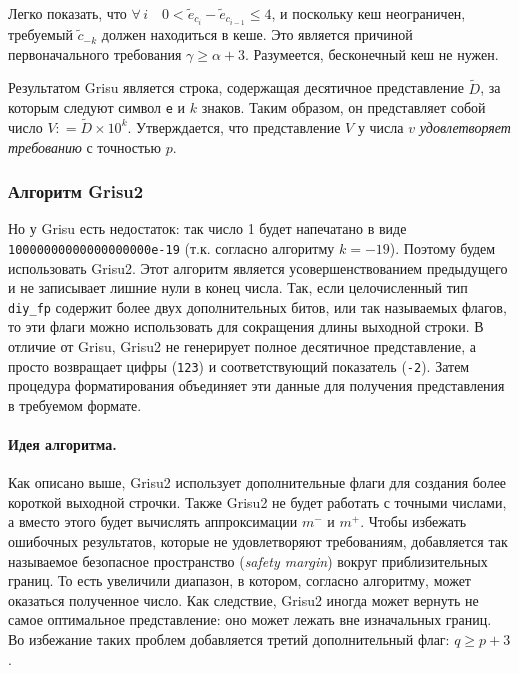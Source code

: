 Легко показать, что $\forall \, i \quad 0 < \tilde{e}_{c_i} - \tilde{e}_{c_{i-1}} \leqslant 4$, и поскольку кеш неограничен, требуемый $\tilde{c}_{-k}$ должен находиться в кеше. 
Это является причиной первоначального требования $\gamma \geqslant \alpha + 3$.
Разумеется, бесконечный кеш не нужен. 

Результатом \textsf{Grisu} является строка, содержащая десятичное представление $\tilde{D}$, за которым следуют символ \texttt{e} и $k$ знаков. 
Таким образом, он представляет собой число $V: = \tilde{D} \times 10^k$. 
Утверждается, что представление $V$ у числа $v$ \textit{удовлетворяет требованию} с точностью $p$.

\subsubsection{Алгоритм \textsf{Grisu2}}
Но у \textsf{Grisu} есть недостаток: так число 1 будет напечатано в виде \\ \texttt{10000000000000000000e-19} (т.к. согласно алгоритму $k=-19$).
Поэтому будем использовать \textsf{Grisu2}.
Этот алгоритм является усовершенствованием предыдущего и не записывает лишние нули в конец числа.
Так, если целочисленный тип \texttt{diy\_fp} содержит более двух дополнительных битов, или так называемых флагов, то эти флаги можно использовать для сокращения длины выходной строки.
В отличие от \textsf{Grisu}, \textsf{Grisu2} не генерирует полное десятичное представление, а просто возвращает цифры (\texttt{123}) и соответствующий показатель (\texttt{-2}). 
Затем процедура форматирования объединяет эти данные для получения представления в требуемом формате.

\paragraph{Идея алгоритма.} 
Как описано выше, \textsf{Grisu2} использует дополнительные флаги для создания более короткой выходной строчки. 
Также \textsf{Grisu2} не будет работать с точными числами, а вместо этого будет вычислять аппроксимации $m^{-}$ и $m^+$. 
Чтобы избежать ошибочных результатов, которые не удовлетворяют требованиям, добавляется так называемое безопасное пространство (\textit{safety margin}) вокруг приблизительных границ.
То есть увеличили диапазон, в котором, согласно алгоритму, может оказаться полученное число.  
Как следствие, \textsf{Grisu2} иногда может вернуть не самое оптимальное представление: оно может лежать вне изначальных границ. 
Во избежание таких проблем добавляется третий дополнительный флаг: $q \geqslant p + 3$.

